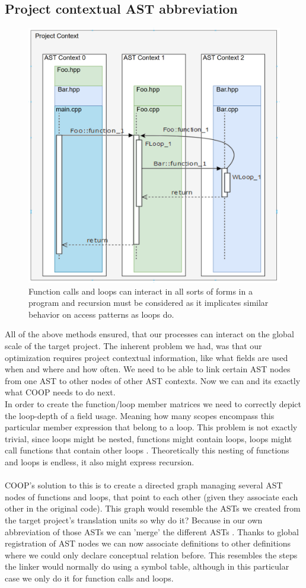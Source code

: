 \subsection{Project contextual AST abbreviation}
\begin{figure}
	\centering
	\includegraphics[width=.6\textwidth, height=0.42\textwidth]{PICs/recursion_context}
	\caption{Function calls and loops can interact in all sorts of forms in a program and recursion must be considered as it implicates similar behavior on access patterns as loops do.}\label{recursion}
\end{figure}
All of the above methods ensured, that our processes can interact on the global scale of the target project. The inherent problem we had, was that our optimization requires project contextual information, like what fields are used when and where and how often. We need to be able to link certain AST nodes from one AST to other nodes of other AST contexts. Now we can and its exactly what COOP needs to do next.\\
In order to create the function/loop member matrices we need to correctly depict the loop-depth of a field usage. Meaning how many scopes encompass this particular member expression that belong to a loop. This problem is not exactly trivial, since loops might be nested, functions might contain loops, loops might call functions that contain other loops . Theoretically this nesting of functions and loops is endless, it also might express recursion.\\\\
COOP's solution to this is to create a directed graph managing several AST nodes of functions and loops, that point to each other (given they associate each other in the original code). This graph would resemble the ASTs we created from the target project's translation units so why do it? Because in our own abbreviation of those ASTs we can 'merge' the different ASTs . Thanks to global registration of AST nodes we can now associate definitions to other definitions where we could only declare conceptual relation before. This resembles the steps the linker would normally do using a symbol table, although in this particular case we only do it for function calls and loops.\\
